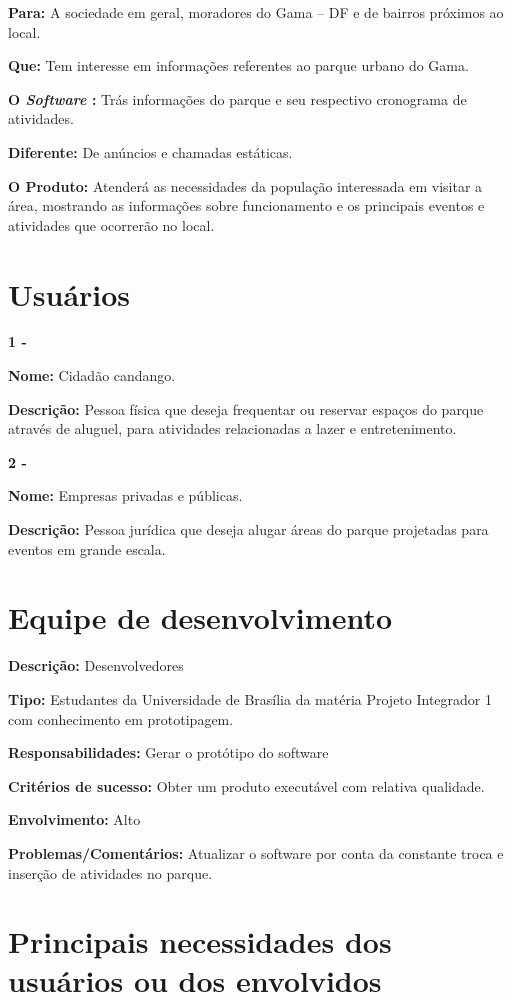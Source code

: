 \begin{anexosenv}
\textbf{Para:} A sociedade em geral, moradores do Gama – DF e de bairros próximos ao local.

\textbf{Que:} Tem interesse em informações referentes ao parque urbano do Gama.

\textbf{O \textit{Software} :} Trás informações do parque e seu respectivo cronograma de atividades.

\textbf{Diferente:} De anúncios e chamadas estáticas.

\textbf{O Produto:} Atenderá as necessidades da população interessada em visitar a área, mostrando as informações sobre funcionamento e os principais eventos e atividades que ocorrerão no local.

\section {Usuários}

\textbf{1 -}

\textbf{Nome:} Cidadão candango.

\textbf{Descrição:} Pessoa física que deseja frequentar ou reservar espaços do parque através de aluguel, para atividades relacionadas a lazer e entretenimento.

\textbf{2 -}

\textbf{Nome:} Empresas privadas e públicas.

\textbf{Descrição:} Pessoa jurídica que deseja alugar áreas do parque projetadas para eventos em grande escala.

\section {Equipe de desenvolvimento}

\textbf{Descrição:} Desenvolvedores

\textbf{Tipo:} Estudantes da Universidade de Brasília da matéria Projeto Integrador 1 com conhecimento em prototipagem.

\textbf{Responsabilidades:} Gerar o protótipo do software

\textbf{Critérios de sucesso:} Obter um produto executável com relativa qualidade.

\textbf{Envolvimento:} Alto

\textbf{Problemas/Comentários:} Atualizar o software por conta da constante troca e inserção de atividades no parque. 

\section {Principais necessidades dos usuários ou dos envolvidos}


\end{anexosenv}
